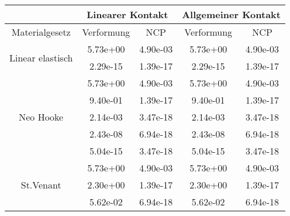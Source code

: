\begin{table} 
\centering 
\begin{tabular}{c|cc|cc|} 
\cline{2-5} 
 & \multicolumn{2}{|c|}{Linearer Kontakt} & \multicolumn{2}{|c|}{Allgemeiner Kontakt} \\ 
\hline 
\multicolumn{1}{|c|}{Materialgesetz} & \multicolumn{1}{c|}{Verformung} & \multicolumn{1}{c|}{NCP} & \multicolumn{1}{c|}{Verformung} & \multicolumn{1}{c|}{NCP} \\ 
\hline 
\multicolumn{1}{|c|}{\multirow{2}{*}{Linear elastisch}} &\multicolumn{1}{|c|}{  5.73e+00} & \multicolumn{1}{|c|}{  4.90e-03} & \multicolumn{1}{|c|}{  5.73e+00} & \multicolumn{1}{|c|}{  4.90e-03} \\ 
\multicolumn{1}{|c|}{} & \multicolumn{1}{|c|}{  2.29e-15} & \multicolumn{1}{|c|}{  1.39e-17} & \multicolumn{1}{|c|}{  2.29e-15} & \multicolumn{1}{|c|}{  1.39e-17} \\ 
\hline 
\multicolumn{1}{|c|}{\multirow{5}{*}{Neo Hooke}} &\multicolumn{1}{|c|}{  5.73e+00} & \multicolumn{1}{|c|}{  4.90e-03} & \multicolumn{1}{|c|}{  5.73e+00} & \multicolumn{1}{|c|}{  4.90e-03} \\ 
\multicolumn{1}{|c|}{} & \multicolumn{1}{|c|}{  9.40e-01} & \multicolumn{1}{|c|}{  1.39e-17} & \multicolumn{1}{|c|}{  9.40e-01} & \multicolumn{1}{|c|}{  1.39e-17} \\ 
\multicolumn{1}{|c|}{} & \multicolumn{1}{|c|}{  2.14e-03} & \multicolumn{1}{|c|}{  3.47e-18} & \multicolumn{1}{|c|}{  2.14e-03} & \multicolumn{1}{|c|}{  3.47e-18} \\ 
\multicolumn{1}{|c|}{} & \multicolumn{1}{|c|}{  2.43e-08} & \multicolumn{1}{|c|}{  6.94e-18} & \multicolumn{1}{|c|}{  2.43e-08} & \multicolumn{1}{|c|}{  6.94e-18} \\ 
\multicolumn{1}{|c|}{} & \multicolumn{1}{|c|}{  5.04e-15} & \multicolumn{1}{|c|}{  3.47e-18} & \multicolumn{1}{|c|}{  5.04e-15} & \multicolumn{1}{|c|}{  3.47e-18} \\ 
\hline 
\multicolumn{1}{|c|}{\multirow{6}{*}{St.Venant}} &\multicolumn{1}{|c|}{  5.73e+00} & \multicolumn{1}{|c|}{  4.90e-03} & \multicolumn{1}{|c|}{  5.73e+00} & \multicolumn{1}{|c|}{  4.90e-03} \\ 
\multicolumn{1}{|c|}{} & \multicolumn{1}{|c|}{  2.30e+00} & \multicolumn{1}{|c|}{  1.39e-17} & \multicolumn{1}{|c|}{  2.30e+00} & \multicolumn{1}{|c|}{  1.39e-17} \\ 
\multicolumn{1}{|c|}{} & \multicolumn{1}{|c|}{  5.62e-02} & \multicolumn{1}{|c|}{  6.94e-18} & \multicolumn{1}{|c|}{  5.62e-02} & \multicolumn{1}{|c|}{  6.94e-18} \\ 

\end{tabular}
\end{table}
